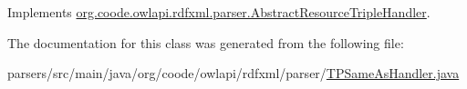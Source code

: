 Implements \hyperlink{classorg_1_1coode_1_1owlapi_1_1rdfxml_1_1parser_1_1_abstract_resource_triple_handler_acfa19ca318d5aaf7fc66e361ba02e7e8}{org.\-coode.\-owlapi.\-rdfxml.\-parser.\-Abstract\-Resource\-Triple\-Handler}.



The documentation for this class was generated from the following file\-:\begin{DoxyCompactItemize}
\item 
parsers/src/main/java/org/coode/owlapi/rdfxml/parser/\hyperlink{_t_p_same_as_handler_8java}{T\-P\-Same\-As\-Handler.\-java}\end{DoxyCompactItemize}

